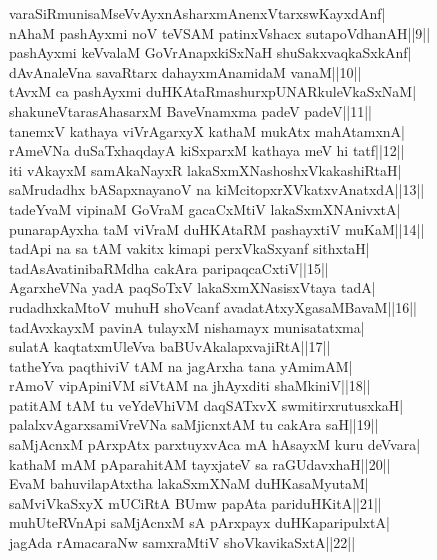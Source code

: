 \documentclass{article}
\begin{document}
varaSiRmunisaMseVvAyxnAsharxmAnenxVtarxswKayxdAnf|\\
nAhaM pashAyxmi noV teVSAM patinxVshacx sutapoVdhanAH||9||\\
pashAyxmi keVvalaM GoVrAnapxkiSxNaH shuSakxvaqkaSxkAnf|\\
dAvAnaleVna savaRtarx dahayxmAnamidaM vanaM||10||\\
tAvxM ca pashAyxmi duHKAtaRmashurxpUNARkuleVkaSxNaM|\\
shakuneVtarasAhasarxM BaveVnamxma padeV padeV||11||\\
tanemxV kathaya viVrAgarxyX kathaM mukAtx mahAtamxnA|\\
rAmeVNa duSaTxhaqdayA kiSxparxM kathaya meV hi tatf||12||\\
iti vAkayxM samAkaNayxR lakaSxmXNashoshxVkakashiRtaH|\\
saMrudadhx bASapxnayanoV na kiMcitopxrXVkatxvAnatxdA||13||\\
tadeYvaM vipinaM GoVraM gacaCxMtiV lakaSxmXNAnivxtA|\\
punarapAyxha taM viVraM duHKAtaRM pashayxtiV muKaM||14||\\
tadApi na sa tAM vakitx kimapi perxVkaSxyanf sithxtaH|\\
tadAsAvatinibaRMdha cakAra paripaqcaCxtiV||15||\\
AgarxheVNa yadA paqSoTxV lakaSxmXNasisxVtaya tadA|\\
rudadhxkaMtoV muhuH shoVcanf avadatAtxyXgasaMBavaM||16||\\
tadAvxkayxM pavinA tulayxM nishamayx munisatatxma|\\
sulatA kaqtatxmUleVva baBUvAkalapxvajiRtA||17||\\
tatheYva paqthiviV tAM na jagArxha tana yAmimAM|\\
rAmoV vipApiniVM siVtAM na j{hA}yxditi shaMkiniV||18||\\
patitAM tAM tu veYdeVhiVM daqSATxvX swmitirxrutusxkaH|\\
palalxvAgarxsamiVreVNa saMjicnxtAM tu cakAra saH||19||\\
saMjAcnxM pArxpAtx parxtuyxvAca mA hAsayxM kuru deVvara|\\
kathaM mAM pAparahitAM tayxjateV sa raGUdavxhaH||20||\\
EvaM bahuvilapAtxtha lakaSxmXNaM duHKasaMyutaM|\\
saMviVkaSxyX mUCiRtA BUmw papAta pariduHKitA||21||\\
muhUteRVnApi saMjAcnxM sA pArxpayx duHKaparipulxtA|\\
jagAda rAmacaraNw samxraMtiV shoVkavikaSxtA||22||\\
\end{document}
